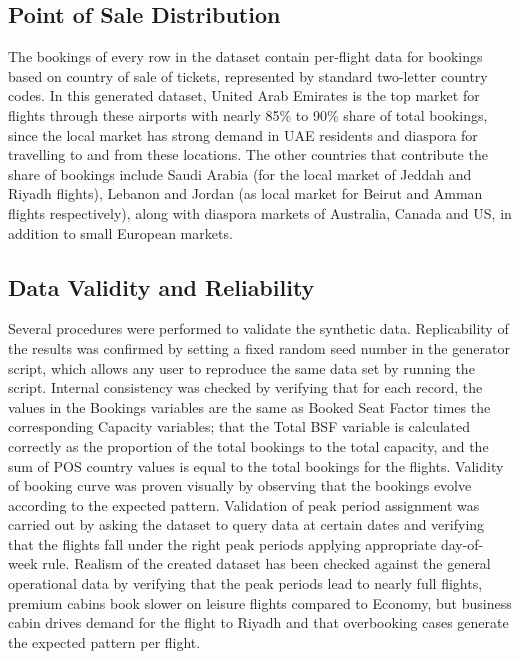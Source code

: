 \subsection{Point of Sale Distribution}

The bookings of every row in the dataset contain per-flight data for bookings based on country of sale of tickets, represented by standard two-letter country codes. In this generated dataset, United Arab Emirates is the top market for flights through these airports with nearly 85\% to 90\% share of total bookings, since the local market has strong demand in UAE residents and diaspora for travelling to and from these locations. The other countries that contribute the share of bookings include Saudi Arabia (for the local market of Jeddah and Riyadh flights), Lebanon and Jordan (as local market for Beirut and Amman flights respectively), along with diaspora markets of Australia, Canada and US, in addition to small European markets.

\subsection{Data Validity and Reliability}

Several procedures were performed to validate the synthetic data. Replicability of the results was confirmed by setting a fixed random seed number in the generator script, which allows any user to reproduce the same data set by running the script. Internal consistency was checked by verifying that for each record, the values in the Bookings variables are the same as Booked Seat Factor times the corresponding Capacity variables; that the Total BSF variable is calculated correctly as the proportion of the total bookings to the total capacity, and the sum of POS country values is equal to the total bookings for the flights. Validity of booking curve was proven visually by observing that the bookings evolve according to the expected pattern. Validation of peak period assignment was carried out by asking the dataset to query data at certain dates and verifying that the flights fall under the right peak periods applying appropriate day-of-week rule. Realism of the created dataset has been checked against the general operational data by verifying that the peak periods lead to nearly full flights, premium cabins book slower on leisure flights compared to Economy, but business cabin drives demand for the flight to Riyadh and that overbooking cases generate the expected pattern per flight.

